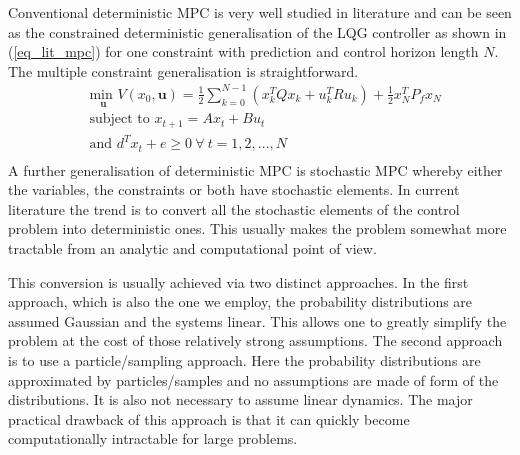 Conventional deterministic MPC is very well studied in literature \cite{raw} and can be seen as the constrained deterministic generalisation of the LQG controller as shown in (\ref{eq_lit_mpc}) for one constraint with prediction and control horizon length $N$. The multiple constraint generalisation is straightforward.
\begin{equation}
\begin{aligned}
&\underset{\mathbf{u}}{\text{min }} V(x_0, \mathbf{u}) = \frac{1}{2}\sum_{k=0}^{N-1} \left( x_k^TQx_k + u_k^TRu_k \right) + \frac{1}{2}x_N^TP_fx_N \\
& \text{subject to } x_{t+1} = Ax_t+Bu_t \\
& \text{and } d^Tx_t + e \geq 0 ~\forall~t=1, 2,...,N \\
\end{aligned}
\label{eq_lit_mpc}
\end{equation}
A further generalisation of deterministic MPC is stochastic MPC whereby either the variables, the constraints or both have stochastic elements. In current literature the trend is to convert all the stochastic elements of the control problem into deterministic ones. This usually makes the problem somewhat more tractable from an analytic and computational point of view.

This conversion is usually achieved via two distinct approaches. In the first approach, which is also the one we employ, the probability distributions are assumed Gaussian and the systems linear. This allows one to greatly simplify the problem at the cost of those relatively strong assumptions. The second approach is to use a particle/sampling approach. Here the probability distributions are approximated by particles/samples and no assumptions are made of form of the distributions. It is also not necessary to assume linear dynamics. The major practical drawback of this approach is that it can quickly become computationally intractable for large problems.

